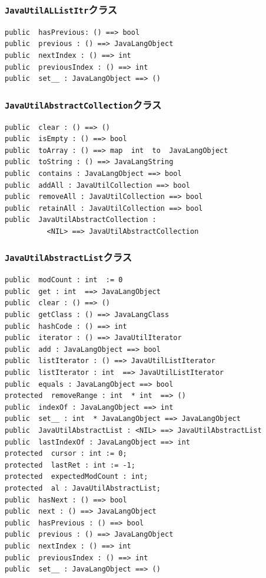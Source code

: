 \documentclass[\pformat,12pt]{jarticle}
\begin{document}
\subsubsection{\texttt{JavaUtilALListItr}クラス}
\begin{small}
\begin{verbatim}
public  hasPrevious: () ==> bool
public  previous : () ==> JavaLangObject
public  nextIndex : () ==> int
public  previousIndex : () ==> int
public  set__ : JavaLangObject ==> ()
\end{verbatim}
\end{small}

\subsubsection{\texttt{JavaUtilAbstractCollection}クラス}
\begin{small}
\begin{verbatim}
public  clear : () ==> ()
public  isEmpty : () ==> bool
public  toArray : () ==> map  int  to  JavaLangObject
public  toString : () ==> JavaLangString
public  contains : JavaLangObject ==> bool
public  addAll : JavaUtilCollection ==> bool
public  removeAll : JavaUtilCollection ==> bool
public  retainAll : JavaUtilCollection ==> bool
public  JavaUtilAbstractCollection : 
          <NIL> ==> JavaUtilAbstractCollection
\end{verbatim}
\end{small}

\subsubsection{\texttt{JavaUtilAbstractList}クラス}
\begin{small}
\begin{verbatim}
public  modCount : int  := 0
public  get : int  ==> JavaLangObject
public  clear : () ==> ()
public  getClass : () ==> JavaLangClass
public  hashCode : () ==> int
public  iterator : () ==> JavaUtilIterator
public  add : JavaLangObject ==> bool
public  listIterator : () ==> JavaUtilListIterator
public  listIterator : int  ==> JavaUtilListIterator
public  equals : JavaLangObject ==> bool
protected  removeRange : int  * int  ==> ()
public  indexOf : JavaLangObject ==> int
public  set__ : int  * JavaLangObject ==> JavaLangObject
public  JavaUtilAbstractList : <NIL> ==> JavaUtilAbstractList
public  lastIndexOf : JavaLangObject ==> int
protected  cursor : int := 0;
protected  lastRet : int := -1;
protected  expectedModCount : int;
protected  al : JavaUtilAbstractList;
public  hasNext : () ==> bool
public  next : () ==> JavaLangObject
public  hasPrevious : () ==> bool
public  previous : () ==> JavaLangObject
public  nextIndex : () ==> int
public  previousIndex : () ==> int
public  set__ : JavaLangObject ==> ()
\end{verbatim}
\end{small}
\end{document}

